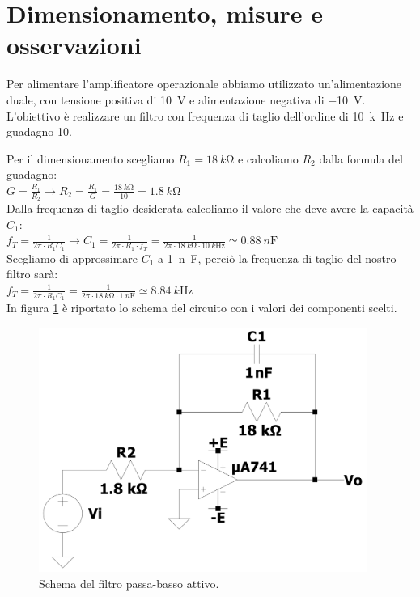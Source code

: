 \documentclass{report}
\begin{document}
\section{Dimensionamento, misure e osservazioni}
Per alimentare l'amplificatore operazionale abbiamo utilizzato un'alimentazione duale, con tensione positiva di \SI{10}{\volt} e alimentazione negativa di \SI{-10}{\volt}. L'obiettivo è realizzare un filtro con frequenza di taglio dell'ordine di \SI{10}{k\hertz} e guadagno 10. \par
\noindent Per il dimensionamento scegliamo $R_1=\SI{18}{k\ohm}$ e calcoliamo $R_2$ dalla formula del guadagno:
\\[2pt]\indent$\displaystyle{G=\frac{R_1}{R_2}\rightarrow R_2=\frac{R_1}{G} = \frac{\SI{18}{k\ohm}}{10}=\SI{1.8}{k\ohm}}$ 
\\[2pt]Dalla frequenza di taglio desiderata calcoliamo il valore che deve avere la capacità $C_1$:
\\[2pt]\indent$\displaystyle{f_T=\frac{1}{2\pi\cdot R_1C_1}\rightarrow C_1=\frac{1}{2\pi\cdot R_1\cdot f_T}=\frac{1}{2\pi\cdot \SI{18}{k\ohm}\cdot \SI{10}{k\hertz}}\simeq\SI{0.88}{n\farad}}$
\\[4pt]Scegliamo di approssimare $C_1$ a \SI{1}{n\farad}, perciò la frequenza di taglio del nostro filtro sarà:
\\[2pt]\indent$\displaystyle{f_T=\frac{1}{2\pi\cdot R_1C_1}=\frac{1}{2\pi\cdot \SI{18}{k\ohm}\cdot \SI{1}{n\farad}}\simeq\SI{8.84}{k\hertz}}$ %
\\[4pt]In figura \ref{figura:cto_filtro} è riportato lo schema del circuito con i valori dei componenti scelti. 
\begin{figure}[h!]
\centering
\includegraphics[height=8cm]{immagini/cto_filtro}
\caption{Schema del filtro passa-basso attivo.}
\label{figura:cto_filtro}
\end{figure}
\end{document}

